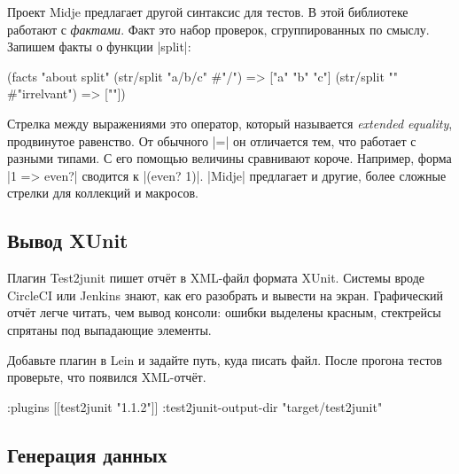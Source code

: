 
Проект Midje предлагает другой
синтаксис для тестов. В этой библиотеке работают с \emph{фактами}. Факт это
набор проверок, сгруппированных по смыслу. Запишем факты о функции
\spverb|split|:

\begin{english}
  \begin{clojure}
(facts "about split"
 (str/split "a/b/c" #"/") => ["a" "b" "c"]
 (str/split "" #"irrelvant") => [""])
  \end{clojure}
\end{english}


Стрелка между выражениями это оператор, который называется \emph{extended equality},
продвинутое равенство. От обычного \spverb|=| он отличается тем, что работает
с разными типами. С его помощью величины сравнивают короче. Например, форма
\spverb|1 => even?| сводится к \spverb|(even? 1)|. \spverb|Midje| предлагает
и другие, более сложные стрелки для коллекций и макросов.

\subsection{Вывод XUnit}


Плагин Test2junit пишет отч\"{е}т
в XML-файл формата XUnit. Системы вроде CircleCI или Jenkins знают, как его
разобрать и вывести на экран. Графический отч\"{е}т легче читать, чем вывод консоли:
ошибки выделены красным, стектрейсы спрятаны под выпадающие элементы.

Добавьте плагин в Lein и задайте путь, куда писать файл. После прогона тестов
проверьте, что появился XML-отч\"{е}т.

\begin{english}
  \begin{clojure}
:plugins [[test2junit "1.1.2"]]
:test2junit-output-dir "target/test2junit"
  \end{clojure}
\end{english}

\subsection{Генерация данных}

